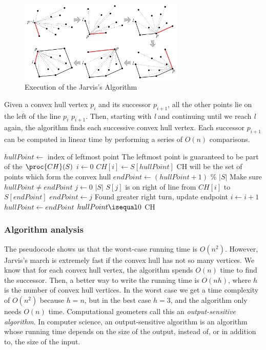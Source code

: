 \documentclass{article}
\begin{document}
\begin{figure}[h]
\centering
\includegraphics[width=0.7\textwidth]{jarvis/jarvis_visual.png}
\caption{\label{fig:jarvis_visual}Execution of the Jarvis’s Algorithm \cite{jeffe}}
\end{figure}

Given a convex hull vertex $p_i$ and its successor $p_{i+1}$, all the other points lie on the left of the line $p_i$ $p_{i+1}$. Then, starting with \textit{l} and continuing until we reach \textit{l} again, the algorithm finds each successive convex hull vertex. Each successor $p_{i+1}$ can be computed in linear time by performing a series of $O(n)$ comparisons.

\begin{codebox}
\li $hullPoint \gets$ index of leftmost point \Comment The leftmost point is guaranteed to be part of the $\proc{CH}(S)$
\li $i \gets 0$
\li \Repeat
\li     $CH[i] \gets S[hullPoint]$ \>\>\>\>\>\Comment CH will be the set of points which form the convex hull
\li     $endPoint \gets (hullPoint + 1)$ \% $|S| $ \>\>\>\>\>\>\>\Comment Make sure $hullPoint \neq endPoint$
\li     \For $j \gets 0$ \To $|S|$
        \Do
\li         \If $S[j]$ is on right of line from $CH[i]$ to $S[endPoint]$
\li         \Then
                $endPoint \gets j$ \>\>\>\>\>\Comment Found greater right turn, update endpoint
            \End
        \End
\li     $i \gets i+1$
\li     $hullPoint \gets endPoint$
\li \Until $hullPoint \isequal 0$
\li \Return CH
\end{codebox}

\subsubsection*{Algorithm analysis}
The pseudocode shows us that the worst-case running time is $O(n^2)$. However, Jarvis’s march is extremely fast if the convex hull has not so many vertices. We know that for each convex hull vertex, the algorithm spends $O(n)$ time to find the successor. Then, a better way to write the running time is $O(nh)$, where $h$ is the number of convex hull vertices. In the worst case we get a time complexity of $O(n^2)$ because $h = n$, but in the best case $h = 3$, and the algorithm only needs $O(n)$ time. Computational geometers call this an \textit{output-sensitive algorithm}. In computer science, an output-sensitive algorithm is an algorithm whose running time depends on the size of the output, instead of, or in addition to, the size of the input. \cite{wiki:1}
\end{document}

